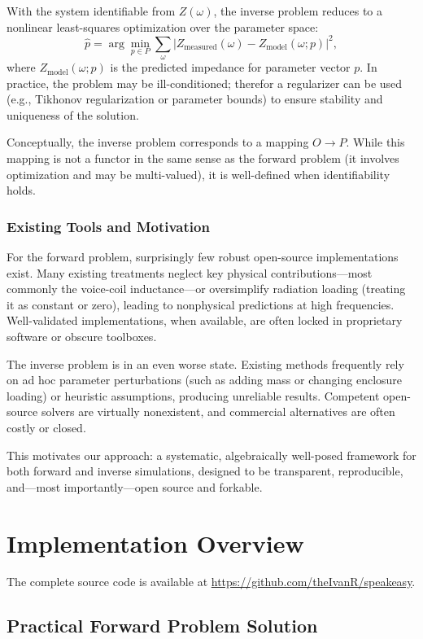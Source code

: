 With the system identifiable from $Z(\omega)$, the inverse problem reduces to a nonlinear least-squares optimization over the parameter space:
\[
\hat{p} = \arg\min_{p \in P} \sum_{\omega} \bigl| Z_{\text{measured}}(\omega) - Z_{\text{model}}(\omega; p) \bigr|^2,
\]
where $Z_{\text{model}}(\omega; p)$ is the predicted impedance for parameter vector $p$. In practice, the problem may be ill-conditioned; therefor a regularizer can be used (e.g., Tikhonov regularization or parameter bounds) to ensure stability and uniqueness of the solution.

Conceptually, the inverse problem corresponds to a mapping $O \to P$. While this mapping is not a functor in the same sense as the forward problem (it involves optimization and may be multi-valued), it is well-defined when identifiability holds.

\subsubsection{Existing Tools and Motivation}

For the forward problem, surprisingly few robust open-source implementations exist. Many existing treatments neglect key physical contributions—most commonly the voice-coil inductance—or oversimplify radiation loading (treating it as constant or zero), leading to nonphysical predictions at high frequencies. Well-validated implementations, when available, are often locked in proprietary software or obscure toolboxes.

The inverse problem is in an even worse state. Existing methods frequently rely on ad hoc parameter perturbations (such as adding mass or changing enclosure loading) or heuristic assumptions, producing unreliable results. Competent open-source solvers are virtually nonexistent, and commercial alternatives are often costly or closed.

This motivates our approach: a systematic, algebraically well-posed framework for both forward and inverse simulations, designed to be transparent, reproducible, and—most importantly—open source and forkable.


\newpage
\section{Implementation Overview}

The complete source code is available at \url{https://github.com/theIvanR/speakeasy}. 

\subsection{Practical Forward Problem Solution}

